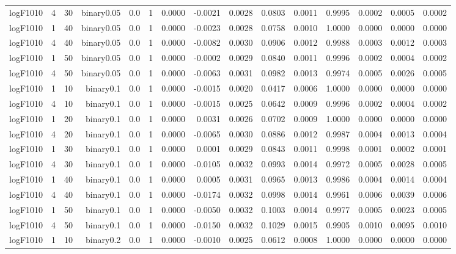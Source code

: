 \begin{longtable}{rrrrrrrrrrrrrrr}
  logF1010 & 4 & 30 & binary0.05 & 0.0 & 1 & 0.0000 & -0.0021 & 0.0028 & 0.0803 & 0.0011 & 0.9995 & 0.0002 & 0.0005 & 0.0002 \\ 
  logF1010 & 1 & 40 & binary0.05 & 0.0 & 1 & 0.0000 & -0.0023 & 0.0028 & 0.0758 & 0.0010 & 1.0000 & 0.0000 & 0.0000 & 0.0000 \\ 
  logF1010 & 4 & 40 & binary0.05 & 0.0 & 1 & 0.0000 & -0.0082 & 0.0030 & 0.0906 & 0.0012 & 0.9988 & 0.0003 & 0.0012 & 0.0003 \\ 
  logF1010 & 1 & 50 & binary0.05 & 0.0 & 1 & 0.0000 & -0.0002 & 0.0029 & 0.0840 & 0.0011 & 0.9996 & 0.0002 & 0.0004 & 0.0002 \\ 
  logF1010 & 4 & 50 & binary0.05 & 0.0 & 1 & 0.0000 & -0.0063 & 0.0031 & 0.0982 & 0.0013 & 0.9974 & 0.0005 & 0.0026 & 0.0005 \\ 
  logF1010 & 1 & 10 & binary0.1 & 0.0 & 1 & 0.0000 & -0.0015 & 0.0020 & 0.0417 & 0.0006 & 1.0000 & 0.0000 & 0.0000 & 0.0000 \\ 
  logF1010 & 4 & 10 & binary0.1 & 0.0 & 1 & 0.0000 & -0.0015 & 0.0025 & 0.0642 & 0.0009 & 0.9996 & 0.0002 & 0.0004 & 0.0002 \\ 
  logF1010 & 1 & 20 & binary0.1 & 0.0 & 1 & 0.0000 & 0.0031 & 0.0026 & 0.0702 & 0.0009 & 1.0000 & 0.0000 & 0.0000 & 0.0000 \\ 
  logF1010 & 4 & 20 & binary0.1 & 0.0 & 1 & 0.0000 & -0.0065 & 0.0030 & 0.0886 & 0.0012 & 0.9987 & 0.0004 & 0.0013 & 0.0004 \\ 
  logF1010 & 1 & 30 & binary0.1 & 0.0 & 1 & 0.0000 & 0.0001 & 0.0029 & 0.0843 & 0.0011 & 0.9998 & 0.0001 & 0.0002 & 0.0001 \\ 
  logF1010 & 4 & 30 & binary0.1 & 0.0 & 1 & 0.0000 & -0.0105 & 0.0032 & 0.0993 & 0.0014 & 0.9972 & 0.0005 & 0.0028 & 0.0005 \\ 
  logF1010 & 1 & 40 & binary0.1 & 0.0 & 1 & 0.0000 & 0.0005 & 0.0031 & 0.0965 & 0.0013 & 0.9986 & 0.0004 & 0.0014 & 0.0004 \\ 
  logF1010 & 4 & 40 & binary0.1 & 0.0 & 1 & 0.0000 & -0.0174 & 0.0032 & 0.0998 & 0.0014 & 0.9961 & 0.0006 & 0.0039 & 0.0006 \\ 
  logF1010 & 1 & 50 & binary0.1 & 0.0 & 1 & 0.0000 & -0.0050 & 0.0032 & 0.1003 & 0.0014 & 0.9977 & 0.0005 & 0.0023 & 0.0005 \\ 
  logF1010 & 4 & 50 & binary0.1 & 0.0 & 1 & 0.0000 & -0.0150 & 0.0032 & 0.1029 & 0.0015 & 0.9905 & 0.0010 & 0.0095 & 0.0010 \\ 
  logF1010 & 1 & 10 & binary0.2 & 0.0 & 1 & 0.0000 & -0.0010 & 0.0025 & 0.0612 & 0.0008 & 1.0000 & 0.0000 & 0.0000 & 0.0000 \\ 

\end{longtable}
